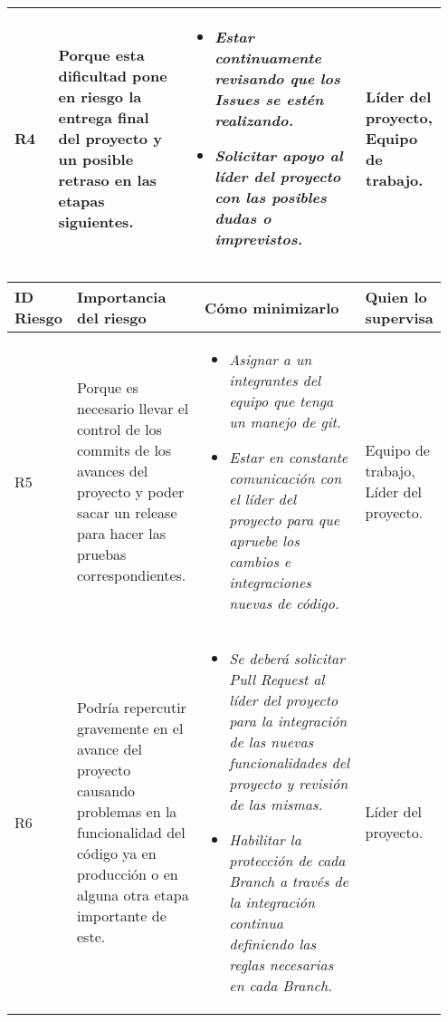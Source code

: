 \documentclass[12pt,a4paper]{article}
\begin{document}
\begin{table}[h!]
\begin{tabular}{|p{0.10\linewidth}|p{0.30\linewidth}|p{0.40\linewidth}|p{0.15\linewidth}|}
R4&Porque esta dificultad pone en riesgo la entrega final del proyecto y un posible retraso en las etapas siguientes.&\begin{itemize}
\item \textit{Estar continuamente revisando que los Issues se estén realizando.}
\item \textit{Solicitar apoyo al líder del proyecto con las posibles dudas o imprevistos.}
\end{itemize}
&Líder del proyecto, Equipo de trabajo.\\\hline
\end{tabular}
\end{table}

\newpage

\begin{table}[h!]
\begin{tabular}{|p{0.10\linewidth}|p{0.30\linewidth}|p{0.40\linewidth}|p{0.15\linewidth}|}
\hline
\textbf{ID Riesgo}&\textbf{Importancia del riesgo}&\textbf{Cómo minimizarlo}&\textbf{Quien lo supervisa}
\\\hline

R5&Porque es necesario llevar el control de los commits de los avances del proyecto y poder sacar un release para hacer las pruebas correspondientes.&\begin{itemize}
\item \textit{Asignar a un integrantes del equipo que tenga un manejo de git.}
\item \textit{Estar en constante comunicación con el líder del proyecto para que apruebe los cambios e integraciones nuevas de código.}
\end{itemize}&Equipo de trabajo, Líder del proyecto.\\\hline

R6&Podría repercutir gravemente en el avance del proyecto causando problemas en la funcionalidad del código ya en producción o en alguna otra etapa importante de este.&\begin{itemize}
\item \textit{Se deberá solicitar Pull Request al líder del proyecto para la integración de las nuevas funcionalidades del proyecto y revisión de las mismas.}
\item \textit{Habilitar la protección de cada Branch a través de la integración continua definiendo las reglas necesarias en cada Branch.}
\end{itemize} 
&Líder del proyecto.\\\hline


\end{tabular}
\end{table}
\end{document}
